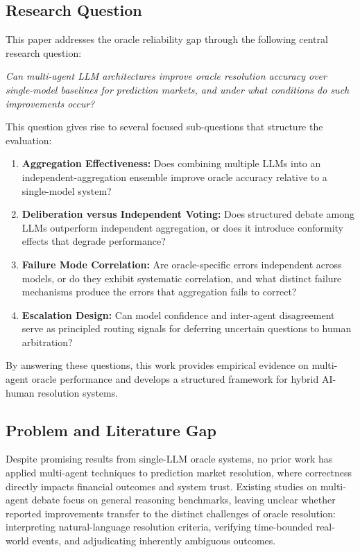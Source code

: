 \subsection{Research Question}

This paper addresses the oracle reliability gap through the following central research question:

\emph{Can multi-agent LLM architectures improve oracle resolution accuracy over single-model baselines for prediction markets, and under what conditions do such improvements occur?}

This question gives rise to several focused sub-questions that structure the evaluation:

\begin{enumerate}
    \item \textbf{Aggregation Effectiveness:} Does combining multiple LLMs into an independent-aggregation ensemble improve oracle accuracy relative to a single-model system?
    
    \item \textbf{Deliberation versus Independent Voting:} Does structured debate among LLMs outperform independent aggregation, or does it introduce conformity effects that degrade performance?
    
    \item \textbf{Failure Mode Correlation:} Are oracle-specific errors independent across models, or do they exhibit systematic correlation, and what distinct failure mechanisms produce the errors that aggregation fails to correct?
    
    \item \textbf{Escalation Design:} Can model confidence and inter-agent disagreement serve as principled routing signals for deferring uncertain questions to human arbitration?
\end{enumerate}

By answering these questions, this work provides empirical evidence on multi-agent oracle performance and develops a structured framework for hybrid AI-human resolution systems.

\subsection{Problem and Literature Gap}

Despite promising results from single-LLM oracle systems, no prior work has applied multi-agent techniques to prediction market resolution, where correctness directly impacts financial outcomes and system trust. Existing studies on multi-agent debate focus on general reasoning benchmarks, leaving unclear whether reported improvements transfer to the distinct challenges of oracle resolution: interpreting natural-language resolution criteria, verifying time-bounded real-world events, and adjudicating inherently ambiguous outcomes.

